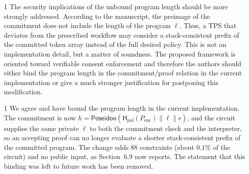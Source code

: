 \begin{reviewcomment}{1}
	The security implications of the unbound program length should be more strongly addressed.
	According to the manuscript, the preimage of the commitment does not include the length of the program $\ell$.
	Thus, a TPS that deviates from the prescribed workflow may consider a stack-consistent prefix of the committed token array instead of the full desired policy.
	This is not an implementation detail, but a matter of soundness.
	The proposed framework is oriented toward verifiable consent enforcement and therefore the authors should either bind the program length in the commitment/proof relation in the current implementation or give a much stronger justification for postponing this modification.
\end{reviewcomment}

\begin{reviewresponse}{1}
	We agree and have bound the program length in the current implementation.
	The commitment is now $h=\mathsf{Poseidon}(\mathsf{H}_{\mathrm{pol}}(P_{\mathrm{enc}})\parallel\ell\parallel r)$, and the circuit supplies the same private $\ell$ to both the commitment check and the interpreter, so an accepting proof can no longer evaluate a shorter stack-consistent prefix of the committed program.
	The change adds $88$ constraints (about $0.1\%$ of the circuit) and no public input, as Section~6.9 now reports.
	The statement that this binding was left to future work has been removed.

\end{reviewresponse}
